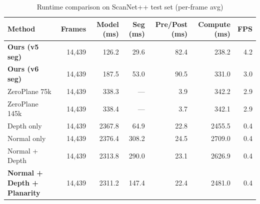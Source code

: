 \begin{table}[t]
  \centering
  \caption{Runtime comparison on ScanNet++ test set (per-frame avg)}
  \label{tab:runtime_combined}
  \begin{tabular}{l r r r r r r}
    \toprule
    Method & Frames & Model (ms) & Seg (ms) & Pre/Post (ms) & Compute (ms) & FPS \\
    \midrule
    \textbf{Ours (v5 seg)} & 14,439 & 126.2 & 29.6 & 82.4 & 238.2 & 4.2 \\
    \textbf{Ours (v6 seg)} & 14,439 & 187.5 & 53.0 & 90.5 & 331.0 & 3.0 \\
    ZeroPlane 75k & 14,439 & 338.3 & --- & 3.9 & 342.2 & 2.9 \\
    ZeroPlane 145k & 14,439 & 338.4 & --- & 3.7 & 342.1 & 2.9 \\
    Depth only & 14,439 & 2367.8 & 64.9 & 22.8 & 2455.5 & 0.4 \\
    Normal only & 14,439 & 2376.4 & 308.2 & 24.5 & 2709.0 & 0.4 \\
    Normal + Depth & 14,439 & 2313.8 & 290.0 & 23.1 & 2626.9 & 0.4 \\
    \textbf{Normal + Depth + Planarity} & 14,439 & 2311.2 & 147.4 & 22.4 & 2481.0 & 0.4 \\
    \bottomrule
  \end{tabular}
\end{table}
